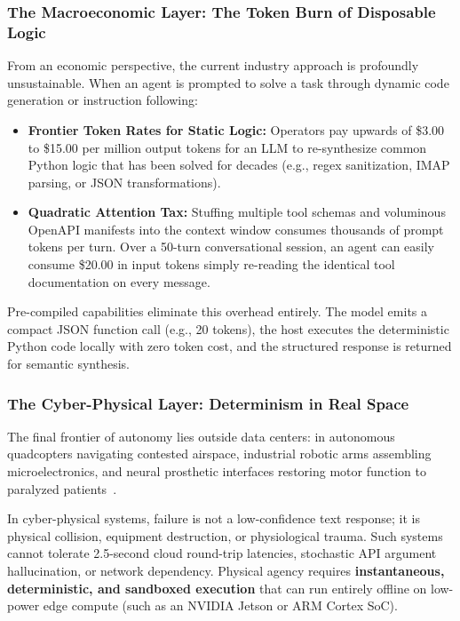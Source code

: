 \subsubsection{The Macroeconomic Layer: The Token Burn of Disposable Logic}
From an economic perspective, the current industry approach is profoundly unsustainable. When an agent is prompted to solve a task through dynamic code generation or instruction following:
\begin{itemize}[leftmargin=*]
  \item \textbf{Frontier Token Rates for Static Logic:} Operators pay upwards of \$3.00 to \$15.00 per million output tokens for an LLM to re-synthesize common Python logic that has been solved for decades (e.g., regex sanitization, IMAP parsing, or JSON transformations).
  \item \textbf{Quadratic Attention Tax:} Stuffing multiple tool schemas and voluminous OpenAPI manifests into the context window consumes thousands of prompt tokens per turn. Over a 50-turn conversational session, an agent can easily consume \$20.00 in input tokens simply re-reading the identical tool documentation on every message.
\end{itemize}

Pre-compiled capabilities eliminate this overhead entirely. The model emits a compact JSON function call (e.g., 20 tokens), the host executes the deterministic Python code locally with zero token cost, and the structured response is returned for semantic synthesis.

\subsubsection{The Cyber-Physical Layer: Determinism in Real Space}
The final frontier of autonomy lies outside data centers: in autonomous quadcopters navigating contested airspace, industrial robotic arms assembling microelectronics, and neural prosthetic interfaces restoring motor function to paralyzed patients~\cite{brohan2022rt1, willett2023speech}.

In cyber-physical systems, failure is not a low-confidence text response; it is physical collision, equipment destruction, or physiological trauma. Such systems cannot tolerate 2.5-second cloud round-trip latencies, stochastic API argument hallucination, or network dependency. Physical agency requires \textbf{instantaneous, deterministic, and sandboxed execution} that can run entirely offline on low-power edge compute (such as an NVIDIA Jetson or ARM Cortex SoC).

